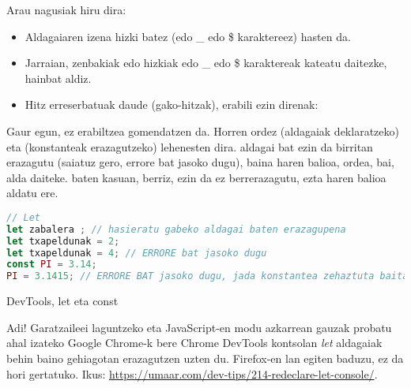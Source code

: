 Arau nagusiak hiru dira:
\begin{itemize}
\item Aldagaiaren izena hizki batez (edo \_ edo \$ karaktereez) hasten da.
\item Jarraian, zenbakiak edo hizkiak edo \_ edo \$ karaktereak kateatu daitezke, hainbat aldiz.

\item Hitz erreserbatuak daude (gako-hitzak), erabili ezin direnak:

\end{itemize} 

Gaur egun, \textit{} ez erabiltzea gomendatzen da. Horren ordez \textit{} (aldagaiak deklaratzeko) eta \textit{} (konstanteak erazagutzeko) lehenesten dira. \textit{} aldagai bat ezin da birritan erazagutu (saiatuz gero, errore bat jasoko dugu), baina haren balioa, ordea, bai, alda daiteke. \textit{} baten kasuan, berriz, ezin da ez berrerazagutu, ezta haren balioa aldatu ere. 

\begin{minipage}{\linewidth}
\begin{lstlisting}[language=JavaScript]
// Let
let zabalera ; // hasieratu gabeko aldagai baten erazagupena
let txapeldunak = 2;
let txapeldunak = 4; // ERRORE bat jasoko dugu
const PI = 3.14;
PI = 3.1415; // ERRORE BAT jasoko dugu, jada konstantea zehaztuta baitago

\end{lstlisting}
\end{minipage}

\begin{alertinfo}{DevTools, let eta const}

 Adi! Garatzaileei laguntzeko eta JavaScript-en modu azkarrean gauzak probatu ahal izateko Google Chrome-k bere Chrome DevTools kontsolan \textit{let} aldagaiak behin baino gehiagotan erazagutzen uzten du. Firefox-en lan egiten baduzu, ez da hori gertatuko. Ikus: \href{https://umaar.com/dev-tips/214-redeclare-let-console/}{https://umaar.com/dev-tips/214-redeclare-let-console/}.

\end{alertinfo}

